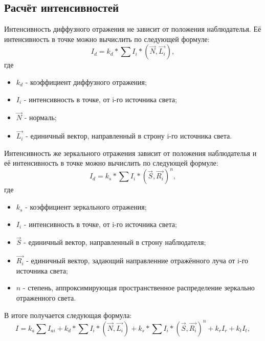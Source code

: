 \documentclass[12pt,a4paper,oneside]{report}
\begin{document}
    		\subsection{Расчёт интенсивностей}
    		\quad Интенсивность диффузного отражения не зависит от положения наблюдателья. Её интенсивность в точке можно вычислить по следующей формуле:
    		\[
    			I_{d} = k_{d} * \sum I_{i}*(\vec{N}, \vec{L_{i}}),
    		\]
    		\quad где 
				\begin{itemize}
    				\item $k_{d}$ - коэффициент диффузного отражения;
    				\item $I_{i}$ - интенсивность в точке, от i-го источника света;
    				\item $\vec{N}$ - нормаль;
    				\item $\vec{L_{i}}$ - единичный вектор, направленный в строну i-го источника света.
    			\end{itemize}
    			\quad Интенсивность же зеркального отражения зависит от положения наблюдателья и её интенсивность в точке можно вычислить по следующей формуле:
    		\[
    			I_{d} = k_{s} * \sum I_{i}*(\vec{S}, \vec{R_{i}})^n,
    		\]
    		\quad где 
				\begin{itemize}
    				\item $k_{s}$ - коэффициент зеркального отражения;
    				\item $I_{i}$ - интенсивность в точке, от i-го источника света;
    				\item $\vec{S}$ - единичный вектор, направленный в строну наблюдателя;
    				\item $\vec{R_{i}}$ - единичный вектор, задающий направленние отражённого луча от i-го источника света;
    				\item $n$ - степень, аппроксимирующая пространственное распределение зеркально отраженного света.
    			\end{itemize}
    		 \quad В итоге получается следующая формула:
    		\[
    				I = k_{a} \sum I_{ai} + k_{d} * \sum I_{i}*(\vec{N}, \vec{L_{i}}) + k_{s} * \sum I_{i}*(\vec{S}, \vec{R_{i}})^n + k_{r}I_{r} + k_{t}I_{t},
			\]
\end{document}
